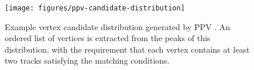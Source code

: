 \begin{figure}
  \texttt{[image: figures/ppv-candidate-distribution]}
  \caption{Example vertex candidate distribution generated by PPV
  \cite{vertex-finder-starnote}. An ordered list of vertices is extracted from
  the peaks of this distribution, with the requirement that each vertex
  contains at least two tracks satisfying the matching conditions.}
  \label{fig:ppv-candidate-distribution}
\end{figure}
